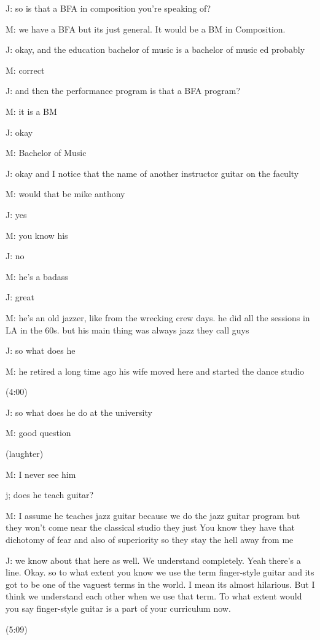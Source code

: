 \documentclass[11pt]{article}
\begin{document}
J: so is that a BFA in composition you're speaking of?

M: we have a BFA but its just general. It would be a BM in Composition.

J: okay, and the education bachelor of music is a bachelor of music ed probably

M: correct

J: and then the performance program is that a BFA program?

M: it is a BM

J: okay

M: Bachelor of Music 

J: okay and I notice that the name of another instructor guitar on the faculty

M: would that be mike anthony

J: yes

M: you know his

J: no

M: he's a badass

J: great

M: he's an old jazzer, like from the wrecking crew days. he did all the sessions in LA in the 60s. but his main thing was always jazz they call guys

J: so what does he

M: he retired a long time ago his wife moved here and started the dance studio

(4:00)

J: so what does he do at the university 

M: good question

(laughter)

M: I never see him

j; does he teach guitar?

M: I assume he teaches jazz guitar because we do the jazz guitar program but they won't come near the classical studio they just You know they have that dichotomy of fear and also of superiority so they stay the hell away from me

J: we know about that here as well. We understand completely. Yeah there's a line. Okay. so to what extent you know we use the term finger-style guitar and its got to be one of the vaguest terms in the world. I mean its almost hilarious. But I think we understand each other when we use that term. To what extent would you say finger-style guitar is a part of your curriculum now.

(5:09)
\end{document}
